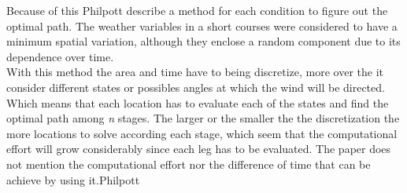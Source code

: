 \newpage




Because of this Philpott \cite{philpott2001optimising} describe a method for each condition to figure out the optimal path.  The weather variables in a short courses were considered to have a minimum spatial variation, although they enclose a random component due to its dependence over time.\\


With this method the area and time have to being discretize, more over the it consider different states or possibles angles at which the wind will be directed. Which means that each location has to evaluate each of the states and find the optimal path among  \textit{n} stages.  The larger or the smaller the the discretization the more locations to solve according each stage, which seem that the computational effort will grow considerably since each leg has to be evaluated.  The paper does not mention the computational effort nor the difference of time that can be achieve by using it.Philpott \cite{philpott2001optimising}


